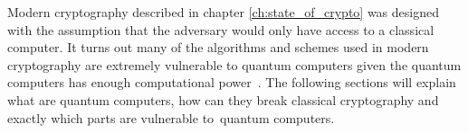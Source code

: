 Modern cryptography described in chapter \ref{ch:state_of_crypto} was designed with the assumption that the adversary would only have access to a classical computer. It turns out many of the algorithms and schemes used in modern cryptography are extremely vulnerable to quantum computers given the quantum computers has enough computational power~\cite{Bernstein2009}. The following sections will explain what are quantum computers, how can they break classical cryptography and exactly which parts are vulnerable to~quantum computers.



